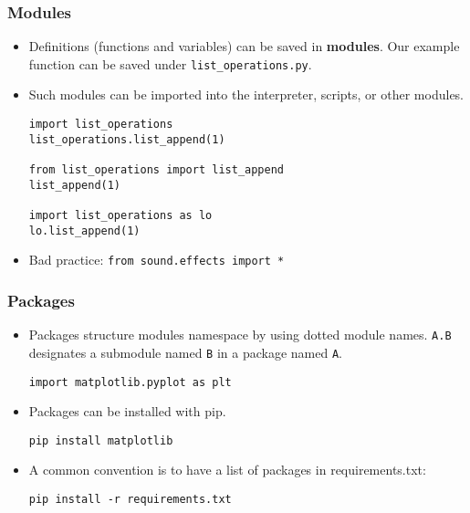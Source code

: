 \begin{frame}[fragile]
    \frametitle{Modules}
    \begin{itemize}
        \item Definitions (functions and variables) can be saved
        in \textbf{modules}. Our example function can be saved under \texttt{list_operations.py}.
        \item Such modules can be imported into the interpreter,
        scripts, or other modules.
\begin{verbatim}
import list_operations
list_operations.list_append(1)

from list_operations import list_append
list_append(1)

import list_operations as lo
lo.list_append(1)
\end{verbatim}
        \item Bad practice: \texttt{from sound.effects import *}
    \end{itemize}
\end{frame}

\begin{frame}
    \frametitle{Packages}
    \begin{itemize}
        \item Packages structure modules namespace by using dotted
        module names. \texttt{A.B} designates a submodule
        named \texttt{B} in a package named
        \texttt{A}.
\begin{verbatim}
import matplotlib.pyplot as plt
\end{verbatim}
        \item Packages can be installed with pip.
\begin{verbatim}
pip install matplotlib
\end{verbatim}
        \item A common convention is to have a list of packages in requirements.txt:
\begin{verbatim}
pip install -r requirements.txt
\end{verbatim}
    \end{itemize}
\end{frame}

